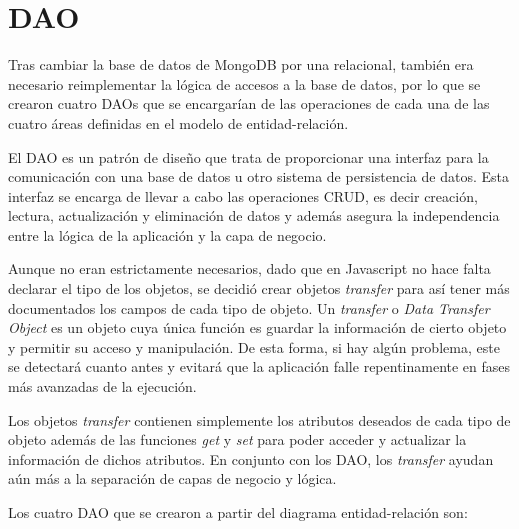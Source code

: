 \documentclass[11pt]{book}
\begin{document}
	
	\chapter{DAO}\label{cap:daos}
	
	Tras cambiar la base de datos de MongoDB por una relacional, también era necesario reimplementar la lógica de accesos a la base de datos, por lo que se crearon cuatro DAOs que se encargarían de las operaciones de cada una de las cuatro áreas definidas en el modelo de entidad-relación.
	
	El DAO es un patrón de diseño que trata de proporcionar una interfaz para la comunicación con una base de datos u otro sistema de persistencia de datos. Esta interfaz se encarga de llevar a cabo las operaciones CRUD, es decir creación, lectura, actualización y eliminación de datos y además asegura la independencia entre la lógica de la aplicación y la capa de negocio.
	
	Aunque no eran estrictamente necesarios, dado que en Javascript no hace falta declarar el tipo de los objetos, se decidió crear objetos \emph{transfer} para así tener más documentados los campos de cada tipo de objeto.
	Un \emph{transfer} o \emph{Data Transfer Object} es un objeto cuya única función es guardar la información de cierto objeto y permitir su acceso y manipulación.
	De esta forma, si hay algún problema, este se detectará cuanto antes y evitará que la aplicación falle repentinamente en fases más avanzadas de la ejecución.
	
	Los objetos \emph{transfer} contienen simplemente los atributos deseados de cada tipo de objeto además de las funciones \emph{get} y \emph{set} para poder acceder y actualizar la información de dichos atributos.
	En conjunto con los DAO, los \emph{transfer} ayudan aún más a la separación de capas de negocio y lógica.
	
	Los cuatro DAO que se crearon a partir del diagrama entidad-relación son:
	
\end{document}
